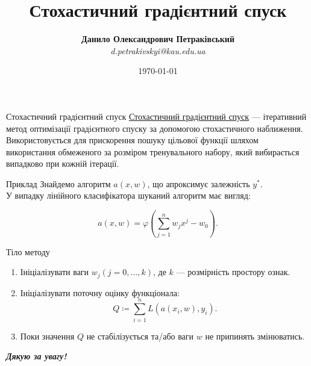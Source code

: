 \documentclass[mathserif]{beamer}
\title{Стохастичний градієнтний спуск}
\institute{Державна наукова установа \\ ``Київський академічний університет``}
\author[Д.О.~Петраківський]{\textbf{Данило Олександрович Петраківський} \\ {\textsl{d.petrakivskyi@kau.edu.ua}}}
\date{\today}
\begin{document}
    \frame{\titlepage}

    \begin{frame}{Стохастичний градієнтний спуск}
        \href{https://en.wikipedia.org/wiki/Stochastic_gradient_descent}{Стохастичний градієнтний спуск} ---
        ітеративний метод оптимізації градієнтного спуску за допомогою стохастичного наближення.
        Використовується для прискорення пошуку цільової функції шляхом використання обмеженого за розміром
        тренувального набору, який вибирається випадково при кожній ітерації.
    \end{frame}

    \begin{frame}{Приклад}
        Знайдемо алгоритм $a(x, w)$, що апроксимує залежність $y ^ *$. \\
        У випадку лінійного класифікатора шуканий алгоритм має вигляд:

        \[a(x, w) = \varphi \left(\sum_{j=1} ^ n w_j x ^ j - w_0 \right).\]
    \end{frame}

    \begin{frame}{Тіло методу}
        \begin{enumerate}
            \item Ініціалізувати ваги $w_j (j = 0, \dots, k)$, де $k$ --- розмірність простору ознак.
            \item Ініціалізувати поточну оцінку функціонала:
                \[Q \coloneqq \sum_{i=1} ^ n L(a(x_i, w), y_i).\]
            \item Поки значення $Q$ не стабілізується та/або ваги $w$ не припинять змінюватись.
        \end{enumerate}
    \end{frame}

    \begin{frame}
        \begin{center}
            \Huge \bfseries \itshape Дякую за увагу!
        \end{center}
    \end{frame}
\end{document}

